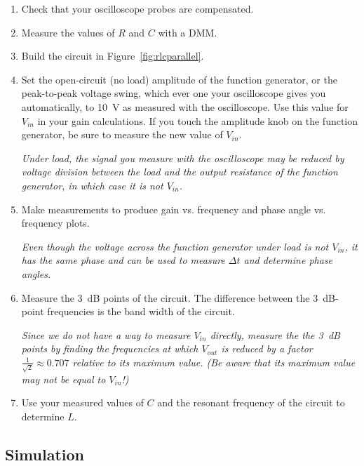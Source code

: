 \documentclass[11pt]{article}
\begin{document}
\begin{enumerate}
\item Check that your oscilloscope probes are compensated.

\item Measure the values of $R$ and $C$ with a DMM.

\item Build the circuit in Figure~\ref{fig:rlcparallel}.

\item Set the open-circuit (no load) amplitude of the function
  generator, or the peak-to-peak voltage swing, which ever one your
  oscilloscope gives you automatically, to 10~V as measured with 
  the oscilloscope. Use this value for $V_{in}$ in your gain
  calculations. If you touch the amplitude knob on the function
  generator, be sure to measure the new value of $V_{in}$. 

  \emph{Under load, the signal you measure with the oscilloscope may
    be reduced by voltage division between the load and the output
    resistance of the function generator, in which case it is not
    $V_{in}$.}
  
\item Make measurements to produce gain vs. frequency and phase angle
  vs. frequency plots.

  \emph{Even though the voltage across the function generator under
    load is not $V_{in}$, it has the same phase and can be used to
    measure $\Delta t$ and determine phase angles.}
  
\item Measure the 3~dB points of the circuit. The difference between
  the 3~dB-point frequencies is the band width of the circuit.

  \emph{Since we do not have a way to measure $V_{in}$ directly,
    measure the the 3~dB points by finding the frequencies at which
    $V_{out}$ is reduced by a factor
    $\frac{1}{\sqrt{2}} \approx 0.707$ relative to its maximum
    value.
    (Be aware that its maximum value may not be equal to $V_{in}$!)}
  
\item Use your measured values of $C$ and the resonant frequency of
  the circuit to determine $L$.
\end{enumerate}

\subsection*{Simulation}
\end{document}
